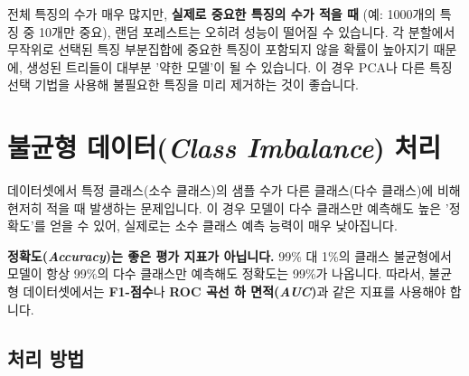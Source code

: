 \documentclass[11pt,a4paper]{book}
\theoremstyle{definition}
\begin{document}
\begin{tcolorbox}[cautionbox, title={랜덤 포레스트가 잘 작동하지 않는 경우}]
전체 특징의 수가 매우 많지만, \textbf{실제로 중요한 특징의 수가 적을 때} (예: 1000개의 특징 중 10개만 중요), 랜덤 포레스트는 오히려 성능이 떨어질 수 있습니다.
각 분할에서 무작위로 선택된 특징 부분집합에 중요한 특징이 포함되지 않을 확률이 높아지기 때문에, 생성된 트리들이 대부분 '약한 모델'이 될 수 있습니다.
이 경우 PCA나 다른 특징 선택 기법을 사용해 불필요한 특징을 미리 제거하는 것이 좋습니다.
\end{tcolorbox}


\section{불균형 데이터(\emph{Class Imbalance}) 처리}

데이터셋에서 특정 클래스(소수 클래스)의 샘플 수가 다른 클래스(다수 클래스)에 비해 현저히 적을 때 발생하는 문제입니다. 이 경우 모델이 다수 클래스만 예측해도 높은 '정확도'를 얻을 수 있어, 실제로는 소수 클래스 예측 능력이 매우 낮아집니다.

\begin{tcolorbox}[cautionbox, title={불균형 데이터 문제 진단}]
\textbf{정확도(\emph{Accuracy})는 좋은 평가 지표가 아닙니다.}
99\% 대 1\%의 클래스 불균형에서 모델이 항상 99\%의 다수 클래스만 예측해도 정확도는 99\%가 나옵니다.
따라서, 불균형 데이터셋에서는 \textbf{F1-점수}나 \textbf{ROC 곡선 하 면적(\emph{AUC})}과 같은 지표를 사용해야 합니다.
\end{tcolorbox}

\subsection{처리 방법}
\end{document}
